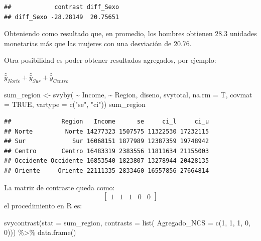 \documentclass[
  12pt,
]{book}
\newenvironment{Shaded}{\begin{snugshade}}{\end{snugshade}}
\newcommand{\AttributeTok}[1]{\textcolor[rgb]{0.77,0.63,0.00}{#1}}
\newcommand{\ConstantTok}[1]{\textcolor[rgb]{0.00,0.00,0.00}{#1}}
\newcommand{\DecValTok}[1]{\textcolor[rgb]{0.00,0.00,0.81}{#1}}
\newcommand{\FunctionTok}[1]{\textcolor[rgb]{0.00,0.00,0.00}{#1}}
\newcommand{\NormalTok}[1]{#1}
\newcommand{\OtherTok}[1]{\textcolor[rgb]{0.56,0.35,0.01}{#1}}
\newcommand{\SpecialCharTok}[1]{\textcolor[rgb]{0.00,0.00,0.00}{#1}}
\newcommand{\StringTok}[1]{\textcolor[rgb]{0.31,0.60,0.02}{#1}}
\begin{document}
\begin{verbatim}
##            contrast diff_Sexo
## diff_Sexo -28.28149  20.75651
\end{verbatim}

Obteniendo como resultado que, en promedio, los hombres obtienen 28.3 unidades monetarias más que las mujeres con una desviación de 20.76.

Otra posibilidad es poder obtener resultados agregados, por ejemplo:

\(\hat{\bar{y}}_{Norte}+\hat{\bar{y}}_{Sur} +\hat{\bar{y}}_{Centro}\)

\begin{Shaded}
\begin{Highlighting}[]
\NormalTok{sum\_region }\OtherTok{\textless{}{-}} \FunctionTok{svyby}\NormalTok{( }\SpecialCharTok{\textasciitilde{}}\NormalTok{ Income,  }\SpecialCharTok{\textasciitilde{}}\NormalTok{ Region,}
\NormalTok{                     diseno, svytotal, }\AttributeTok{na.rm =}\NormalTok{ T,}
                     \AttributeTok{covmat =} \ConstantTok{TRUE}\NormalTok{,}
                     \AttributeTok{vartype =} \FunctionTok{c}\NormalTok{(}\StringTok{"se"}\NormalTok{, }\StringTok{"ci"}\NormalTok{))}
\NormalTok{sum\_region}
\end{Highlighting}
\end{Shaded}

\begin{verbatim}
##              Region   Income      se     ci_l     ci_u
## Norte         Norte 14277323 1507575 11322530 17232115
## Sur             Sur 16068151 1877989 12387359 19748942
## Centro       Centro 16483319 2383556 11811634 21155003
## Occidente Occidente 16853540 1823807 13278944 20428135
## Oriente     Oriente 22111335 2833460 16557856 27664814
\end{verbatim}

La matriz de contraste queda como:
\[
\left[\begin{array}{cccccc}
1 & 1 & 1 & 0 & 0
\end{array}\right]
\]
el procedimiento en R es:

\begin{Shaded}
\begin{Highlighting}[]
\FunctionTok{svycontrast}\NormalTok{(}\AttributeTok{stat =}\NormalTok{ sum\_region,}
            \AttributeTok{contrasts =} \FunctionTok{list}\NormalTok{(}
                             \AttributeTok{Agregado\_NCS =} \FunctionTok{c}\NormalTok{(}\DecValTok{1}\NormalTok{, }\DecValTok{1}\NormalTok{, }\DecValTok{1}\NormalTok{, }\DecValTok{0}\NormalTok{, }\DecValTok{0}\NormalTok{))) }\SpecialCharTok{\%\textgreater{}\%}                        \FunctionTok{data.frame}\NormalTok{()}
\end{Highlighting}
\end{Shaded}
\end{document}
